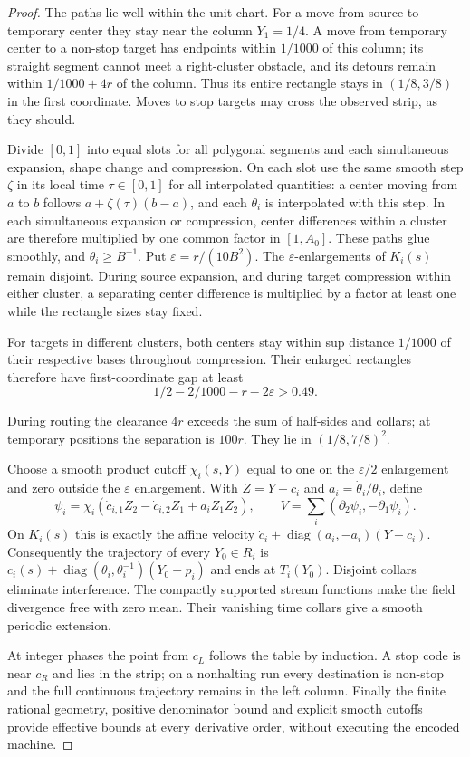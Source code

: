 \begin{proof}
The paths lie well within the unit chart. For a move from source to temporary center they stay near the column $Y_1=1/4$. A move from temporary center to a non-stop target has endpoints within $1/1000$ of this column; its straight segment cannot meet a right-cluster obstacle, and its detours remain within $1/1000+4r$ of the column. Thus its entire rectangle stays in $(1/8,3/8)$ in the first coordinate. Moves to stop targets may cross the observed strip, as they should.

Divide $[0,1]$ into equal slots for all polygonal segments and each simultaneous expansion, shape change and compression. On each slot use the same smooth step $\zeta$ in its local time $\tau\in[0,1]$ for all interpolated quantities: a center moving from $a$ to $b$ follows $a+\zeta(\tau)(b-a)$, and each $\theta_i$ is interpolated with this step. In each simultaneous expansion or compression, center differences within a cluster are therefore multiplied by one common factor in $[1,A_0]$. These paths glue smoothly, and $\theta_i\ge B^{-1}$. Put $\varepsilon=r/(10B^2)$. The $\varepsilon$-enlargements of $K_i(s)$ remain disjoint. During source expansion, and during target compression within either cluster, a separating center difference is multiplied by a factor at least one while the rectangle sizes stay fixed.

\begin{samepage}
For targets in different clusters, both centers stay within sup distance $1/1000$ of their respective bases throughout compression. Their enlarged rectangles therefore have first-coordinate gap at least
\[
 1/2-2/1000-r-2\varepsilon>0.49.
\]
\end{samepage}

During routing the clearance $4r$ exceeds the sum of half-sides and collars; at temporary positions the separation is $100r$. They lie in $(1/8,7/8)^2$.

Choose a smooth product cutoff $\chi_i(s,Y)$ equal to one on the $\varepsilon/2$ enlargement and zero outside the $\varepsilon$ enlargement. With $Z=Y-c_i$ and $a_i=\dot\theta_i/\theta_i$, define
\[
 \psi_i=\chi_i(\dot c_{i,1}Z_2-\dot c_{i,2}Z_1+a_iZ_1Z_2),
 \qquad V=\sum_i(\partial_2\psi_i,-\partial_1\psi_i).
\]
On $K_i(s)$ this is exactly the affine velocity
$\dot c_i+\operatorname{diag}(a_i,-a_i)(Y-c_i)$.
Consequently the trajectory of every $Y_0\in R_i$ is
$c_i(s)+\operatorname{diag}(\theta_i,\theta_i^{-1})(Y_0-p_i)$ and ends at $T_i(Y_0)$. Disjoint collars eliminate interference. The compactly supported stream functions make the field divergence free with zero mean. Their vanishing time collars give a smooth periodic extension.

At integer phases the point from $c_L$ follows the table by induction. A stop code is near $c_R$ and lies in the strip; on a nonhalting run every destination is non-stop and the full continuous trajectory remains in the left column. Finally the finite rational geometry, positive denominator bound and explicit smooth cutoffs provide effective bounds at every derivative order, without executing the encoded machine.
\end{proof}

